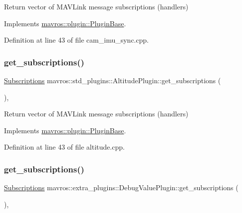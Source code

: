 Return vector of M\+A\+V\+Link message subscriptions (handlers) 



Implements \mbox{\hyperlink{group__plugin_gaf4e23fec6d7436a62cbf0942a2e5791c}{mavros\+::plugin\+::\+Plugin\+Base}}.



Definition at line 43 of file cam\+\_\+imu\+\_\+sync.\+cpp.

\mbox{\label{group__plugin_gafd32c19f38dc1c1c634d9090b3319af6}} 
\subsubsection{\texorpdfstring{get\_subscriptions()}{get\_subscriptions()}\hspace{0.1cm}{\footnotesize\ttfamily [7/41]}}
{\footnotesize\ttfamily \mbox{\hyperlink{group__plugin_ga8967d61fc77040e0c3ea5a4585d62a09}{Subscriptions}} mavros\+::std\+\_\+plugins\+::\+Altitude\+Plugin\+::get\+\_\+subscriptions (\begin{DoxyParamCaption}{ }\end{DoxyParamCaption})\hspace{0.3cm}{\ttfamily [inline]}, {\ttfamily [virtual]}}



Return vector of M\+A\+V\+Link message subscriptions (handlers) 



Implements \mbox{\hyperlink{group__plugin_gaf4e23fec6d7436a62cbf0942a2e5791c}{mavros\+::plugin\+::\+Plugin\+Base}}.



Definition at line 43 of file altitude.\+cpp.

\mbox{\label{group__plugin_ga9ae270242b82f1aebfcccc109c008be1}} 
\subsubsection{\texorpdfstring{get\_subscriptions()}{get\_subscriptions()}\hspace{0.1cm}{\footnotesize\ttfamily [8/41]}}
{\footnotesize\ttfamily \mbox{\hyperlink{group__plugin_ga8967d61fc77040e0c3ea5a4585d62a09}{Subscriptions}} mavros\+::extra\+\_\+plugins\+::\+Debug\+Value\+Plugin\+::get\+\_\+subscriptions (\begin{DoxyParamCaption}{ }\end{DoxyParamCaption})\hspace{0.3cm}{\ttfamily [inline]}, {\ttfamily [virtual]}}



